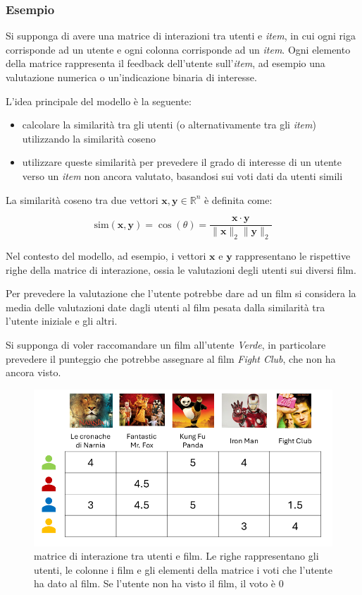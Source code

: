 \subsubsection{Esempio}

Si supponga di avere una matrice di interazioni tra utenti e \textit{item}, in cui ogni riga corrisponde ad un utente e ogni colonna corrisponde ad un \textit{item}. Ogni elemento della matrice rappresenta il feedback dell'utente sull'\textit{item}, ad esempio una valutazione numerica o un'indicazione binaria di interesse.

L'idea principale del modello è la seguente:

\begin{itemize}
    \item calcolare la similarità tra gli utenti (o alternativamente tra gli \textit{item}) utilizzando la similarità coseno
    \item utilizzare queste similarità per prevedere il grado di interesse di un utente verso un \textit{item} non ancora valutato, basandosi sui voti dati da utenti simili
\end{itemize}

La similarità coseno tra due vettori \( \mathbf{x}, \mathbf{y} \in \mathbb{R}^n \) è definita come:

\[
\text{sim}(\mathbf{x}, \mathbf{y}) = \cos(\theta) = \frac{\mathbf{x} \cdot \mathbf{y}}{\|\mathbf{x}\|_2 \|\mathbf{y}\|_2}
\]

Nel contesto del modello, ad esempio, i vettori \( \mathbf{x} \) e \( \mathbf{y} \) rappresentano le rispettive righe della matrice di interazione, ossia le valutazioni degli utenti sui diversi film.

Per prevedere la valutazione che l'utente potrebbe dare ad un film si considera la media delle valutazioni date dagli utenti al film pesata dalla similarità tra l'utente iniziale e gli altri.

Si supponga di voler raccomandare un film all'utente \textit{Verde}, in particolare prevedere il punteggio che potrebbe assegnare al film \textit{Fight Club}, che non ha ancora visto.

\begin{figure}[H]
    \centering
    \includegraphics[scale=0.5]{figures/collaborative_filtering/interaction_matrix.png}
    \caption{matrice di interazione tra utenti e film. Le righe rappresentano gli utenti, le colonne i film e gli elementi della matrice i voti che l'utente ha dato al film. Se l'utente non ha visto il film, il voto è $0$}
\end{figure}

